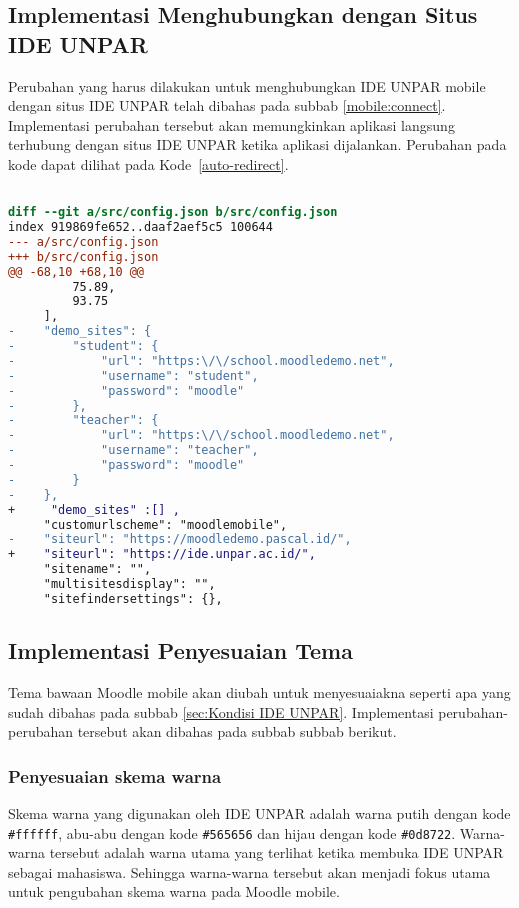 \subsection{Implementasi Menghubungkan dengan Situs IDE UNPAR}

Perubahan yang harus dilakukan untuk menghubungkan IDE UNPAR mobile dengan situs IDE UNPAR telah dibahas pada subbab \ref{mobile:connect}.  Implementasi perubahan tersebut akan memungkinkan aplikasi langsung terhubung dengan situs IDE UNPAR ketika aplikasi dijalankan. Perubahan pada kode dapat dilihat pada  \mbox{Kode \ref{auto-redirect}}. 


\begin{lstlisting}[language=diff, frame=single, label ={auto-redirect}, caption = Perubahan pada file \texttt{config.json} ]

diff --git a/src/config.json b/src/config.json
index 919869fe652..daaf2aef5c5 100644
--- a/src/config.json
+++ b/src/config.json
@@ -68,10 +68,10 @@
         75.89,
         93.75
     ],
-    "demo_sites": {
-        "student": {
-            "url": "https:\/\/school.moodledemo.net",
-            "username": "student",
-            "password": "moodle"
-        },
-        "teacher": {
-            "url": "https:\/\/school.moodledemo.net",
-            "username": "teacher",
-            "password": "moodle"
-        }
-    },
+     "demo_sites" :[] ,
     "customurlscheme": "moodlemobile",
-    "siteurl": "https://moodledemo.pascal.id/",
+    "siteurl": "https://ide.unpar.ac.id/",
     "sitename": "",
     "multisitesdisplay": "",
     "sitefindersettings": {},
\end{lstlisting} 

\subsection{Implementasi Penyesuaian Tema}
Tema bawaan Moodle mobile akan diubah untuk menyesuaiakna seperti apa yang sudah dibahas pada subbab \ref{sec:Kondisi IDE UNPAR}. Implementasi perubahan-perubahan tersebut akan dibahas pada subbab subbab berikut.

\subsubsection{Penyesuaian skema warna}
Skema warna yang digunakan oleh IDE UNPAR adalah warna putih dengan kode \texttt{\#ffffff}, abu-abu dengan kode \texttt{\#565656} dan hijau dengan kode \texttt{\#0d8722}.  Warna-warna tersebut adalah warna utama yang terlihat ketika membuka IDE UNPAR sebagai mahasiswa. Sehingga warna-warna tersebut akan menjadi fokus utama untuk pengubahan skema warna pada Moodle mobile.

